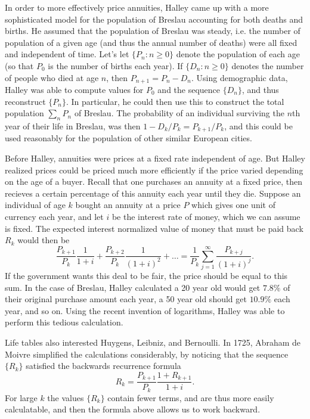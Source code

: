 In order to more effectively price annuities, Halley came up with a more sophisticated model for the population of Breslau accounting for both deaths and births. He assumed that the population of Breslau was steady, i.e. the number of population of a given age (and thus the annual number of deaths) were all fixed and independent of time. Let's let $\{ P_n : n \geq 0 \}$ denote the population of each age (so that $P_0$ is the number of births each year). If $\{ D_n : n \geq 0 \}$ denotes the number of people who died at age $n$, then $P_{n+1} = P_n - D_n$. Using demographic data, Halley was able to compute values for $P_0$ and the sequence $\{ D_n \}$, and thus reconstruct $\{ P_n \}$. In particular, he could then use this to construct the total population $\sum_n P_n$ of Breslau. The probability of an individual surviving the $n$th year of their life in Breslau, was then $1 - D_k / P_k = P_{k+1} / P_k$, and this could be used reasonably for the population of other similar European cities.

Before Halley, annuities were prices at a fixed rate independent of age. But Halley realized prices could be priced much more efficiently if the price varied depending on the age of a buyer. Recall that one purchases an annuity at a fixed price, then recieves a certain percentage of this annuity each year until they die. Suppose an individual of age $k$ bought an annuity at a price $P$ which gives one unit of currency each year, and let $i$ be the interest rate of money, which we can assume is fixed. The expected interest normalized value of money that must be paid back $R_k$ would then be
%
\[ \frac{P_{k+1}}{P_k} \frac{1}{1 + i} + \frac{P_{k+2}}{P_k} \frac{1}{(1 + i)^2} + \dots = \frac{1}{P_k} \sum_{j = 1}^\infty \frac{P_{k+j}}{(1 + i)^j}. \]
%
If the government wants this deal to be fair, the price should be equal to this sum. In the case of Breslau, Halley calculated a 20 year old would get $7.8\%$ of their original purchase amount each year, a 50 year old should get $10.9\%$ each year, and so on. Using the recent invention of logarithms, Halley was able to perform this tedious calculation.

Life tables also interested Huygens, Leibniz, and Bernoulli. In 1725, Abraham de Moivre simplified the calculations considerably, by noticing that the sequence $\{ R_k \}$ satisfied the backwards recurrence formula
%
\[ R_k = \frac{P_{k+1}}{P_k} \frac{1 + R_{k+1}}{1 + i}. \]
%
For large $k$ the values $\{ R_k \}$ contain fewer terms, and are thus more easily calculatable, and then the formula above allows us to work backward.

